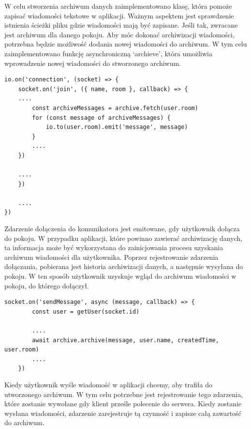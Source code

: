W celu stworzenia archiwum danych zaimplementowano klasę, która pomoże zapisać wiadomości tekstowe w aplikacji. Ważnym aspektem jest sprawdzenie istnienia ścieżki pliku gdzie wiadomości mają być zapisane. Jeśli tak, zwracane jest archiwum dla danego pokoju. Aby móc dokonać archiwizacji wiadomości, potrzebna będzie możliwość dodania nowej wiadomości do archiwum. W tym celu zaimplementowano funkcję asynchroniczną ‘archieve’, która umożliwia wprowadzenie nowej wiadomości do stworzonego archiwum. 
 \begin{lstlisting}[caption=Wykorzystanie zdarzenia dołączenia, aby uzyskać widok zawartości archiwum w aplikacji]
io.on('connection', (socket) => {
    socket.on('join', ({ name, room }, callback) => {
	....
        const archiveMessages = archive.fetch(user.room)
        for (const message of archiveMessages) {
            io.to(user.room).emit('message', message)
        }
        ....
    })

   	....
    })

  	....
})
\end{lstlisting}
Zdarzenie dołączenia do komunikatora jest emitowane, gdy użytkownik dołącza do pokoju. W przypadku aplikacji, które powinno zawierać archiwizację danych, ta informacja może być wykorzystana do zainicjowania procesu uzyskania archiwum wiadomości dla użytkownika. Poprzez rejestrowanie zdarzenia dołączania, pobierana jest historia archiwizacji danych, a następnie wysyłana do pokoju. W ten sposób użytkownik uzyskuje wgląd do archiwum wiadomości w pokoju, do którego dołączył.
 \begin{lstlisting}[caption=Wykorzystanie zdarzenia wysyłania wiadomości do tworzenia archiwum]
socket.on('sendMessage', async (message, callback) => {
        const user = getUser(socket.id)

      	....
        await archive.archive(message, user.name, createdTime, user.room)
       	....
    })
\end{lstlisting}

Kiedy użytkownik wyśle wiadomość w aplikacji chcemy, aby trafiła do utworzonego archiwum. W tym celu potrzebne jest rejestrowanie tego zdarzenia, które zostanie wywołane gdy klient prześle polecenie do serwera. Kiedy zostanie wysłana wiadomości, zdarzenie zarejestruje tą czynność i zapisze całą zawartość do archiwum. 




